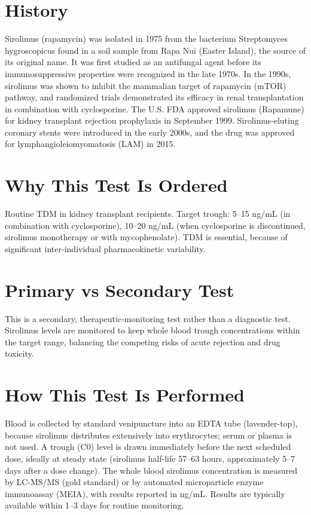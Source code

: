 \section*{History}
Sirolimus (rapamycin) was isolated in 1975 from the bacterium Streptomyces hygroscopicus found in a soil sample from Rapa Nui (Easter Island), the source of its original name. It was first studied as an antifungal agent before its immunosuppressive properties were recognized in the late 1970s. In the 1990s, sirolimus was shown to inhibit the mammalian target of rapamycin (mTOR) pathway, and randomized trials demonstrated its efficacy in renal transplantation in combination with cyclosporine. The U.S. FDA approved sirolimus (Rapamune) for kidney transplant rejection prophylaxis in September 1999. Sirolimus-eluting coronary stents were introduced in the early 2000s, and the drug was approved for lymphangioleiomyomatosis (LAM) in 2015.
\section*{Why This Test Is Ordered}
Routine TDM in kidney transplant recipients. Target trough: 5--15 ng/mL (in combination with cyclosporine), 10--20 ng/mL (when cyclosporine is discontinued, sirolimus monotherapy or with mycophenolate). TDM is essential, because of significant inter-individual pharmacokinetic variability.
\section*{Primary vs Secondary Test}
This is a secondary, therapeutic-monitoring test rather than a diagnostic test. Sirolimus levels are monitored to keep whole blood trough concentrations within the target range, balancing the competing risks of acute rejection and drug toxicity.
\section*{How This Test Is Performed}
Blood is collected by standard venipuncture into an EDTA tube (lavender-top), because sirolimus distributes extensively into erythrocytes; serum or plasma is not used. A trough (C0) level is drawn immediately before the next scheduled dose, ideally at steady state (sirolimus half-life 57--63 hours, approximately 5--7 days after a dose change). The whole blood sirolimus concentration is measured by LC-MS/MS (gold standard) or by automated microparticle enzyme immunoassay (MEIA), with results reported in ng/mL. Results are typically available within 1--3 days for routine monitoring.
